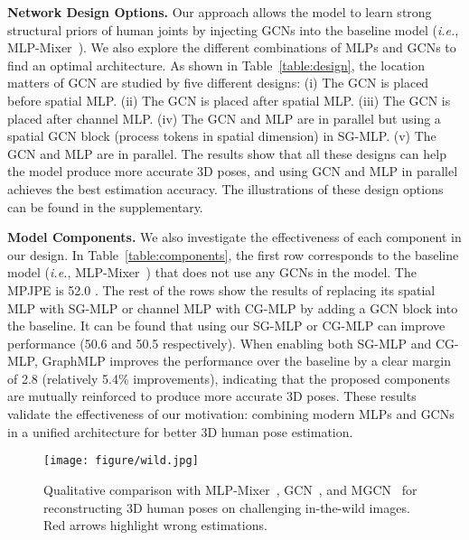 \documentclass[lettersize,journal]{IEEEtran}
\begin{document}
\noindent \textbf{Network Design Options.}
Our approach allows the model to learn strong structural priors of human joints by injecting GCNs into the baseline model (\emph{i.e.}, MLP-Mixer~\cite{mlpmixer}). 
We also explore the different combinations of MLPs and GCNs to find an optimal architecture. 
As shown in Table~\ref{table:design}, the location matters of GCN are studied by five different designs: 
(i) The GCN is placed before spatial MLP. 
(ii) The GCN is placed after spatial MLP. 
(iii) The GCN is placed after channel MLP. 
(iv) The GCN and MLP are in parallel but using a spatial GCN block (process tokens in spatial dimension) in SG-MLP. 
(v) The GCN and MLP are in parallel. 
The results show that all these designs can help the model produce more accurate 3D poses, and using GCN and MLP in parallel achieves the best estimation accuracy. 
The illustrations of these design options can be found in the supplementary. 

\noindent \textbf{Model Components.}
We also investigate the effectiveness of each component in our design. 
In Table~\ref{table:components}, the first row corresponds to the baseline model (\emph{i.e.}, MLP-Mixer~\cite{mlpmixer}) that does not use any GCNs in the model. 
The MPJPE is 52.0 . 
The rest of the rows show the results of replacing its spatial MLP with SG-MLP or channel MLP with CG-MLP by adding a GCN block into the baseline. 
It can be found that using our SG-MLP or CG-MLP can improve performance (50.6  and 50.5  respectively). 
When enabling both SG-MLP and CG-MLP, GraphMLP improves the performance over the baseline by a clear margin of 2.8  (relatively 5.4\% improvements), indicating that the proposed components are mutually reinforced to produce more accurate 3D poses. 
These results validate the effectiveness of our motivation: combining modern MLPs and GCNs in a unified architecture for better 3D human pose estimation. 

\begin{figure}[t]
\centering
\texttt{[image: figure/wild.jpg]}
\caption
{
  Qualitative comparison with MLP-Mixer~\cite{mlpmixer}, GCN~\cite{stgcn}, and MGCN~\cite{zou2021modulated} for reconstructing 3D human poses on challenging in-the-wild images. 
  Red arrows highlight wrong estimations. 
}
\label{fig:wild}
\end{figure}
\end{document}
